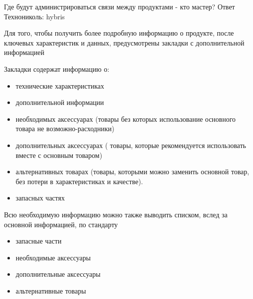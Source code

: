 {\begin{hybris}
Где будут администрироваться связи между продуктами - кто мастер?
Ответ Технониколь: hybris
\end{hybris}


\begin{itogolong}
Для того, чтобы получить более подробную информацию о продукте, после ключевых характеристик и данных, предусмотрены закладки с дополнительной информацией

Закладки содержат информацию о:
\begin{itemize}
\item технические характеристиках 
\item дополнительной информации
\item необходимых аксессуарах (товары без которых использование основного товара не возможно-расходники)
\item дополнительных аксессуарах ( товары, которые рекомендуется использовать вместе с основным товаром) 
\item альтернативных товарах (товары, которыми можно заменить основной товар, без потери в характеристиках и качестве). 
\item запасных частях
\end{itemize}

Всю необходимую информацию можно также выводить списком, вслед за основной информацией, по стандарту 
\begin{itemize}
\item запасные части
\item необходимые аксессуары
\item дополнительные аксессуары
\item альтернативные товары
\end{itemize}

\end{itogolong}




}

